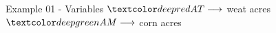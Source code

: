 \begin{frame}{Example 01 - Variables}
\Huge{
$\colora{AT} \longrightarrow$
    weat acres \\ \vspace{1cm}
$\colorb{AM} \longrightarrow$
    corn acres
}
\end{frame}
